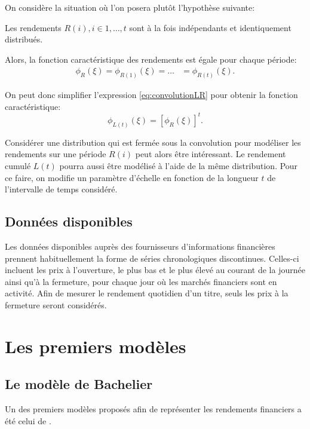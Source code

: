 On considère la situation où l'on posera plutôt l'hypothèse suivante:
\begin{hypothese}
  Les rendements $R(i), i \in 1, \ldots, t$ sont à la fois
  indépendants et identiquement distribués.
\end{hypothese}

Alors, la fonction caractéristique des rendements est égale pour
chaque période:
\begin{align}
  \label{eq:rendementsIID}
  \phi_{R}(\xi) = \phi_{R(1)}(\xi) = \ldots &= \phi_{R(t)}(\xi).
\end{align}

On peut donc simplifier l'expression \eqref{eq:convolutionLR} pour
obtenir la fonction caractéristique:
\begin{equation}
  \label{eq:convolution2}
  \phi_{L(t)}(\xi) = \left[\phi_{R}(\xi)\right]^t.
\end{equation}

Considérer une distribution qui est fermée sous la convolution pour
modéliser les rendements sur une période $R(i)$ peut alors être
intéressant. Le rendement cumulé $L(t)$ pourra aussi être
modélisé à l'aide de la même distribution. Pour ce faire, on modifie
un paramètre d’échelle en fonction de la longueur $t$ de l'intervalle
de temps considéré.

\subsection{Données disponibles}
\label{sec:donneesdisponibles}

Les données disponibles auprès des fournisseurs d'informations
financières prennent habituellement la forme de séries chronologiques
discontinues. Celles-ci incluent les prix à l'ouverture, le plus bas
et le plus élevé au courant de la journée ainsi qu'à la fermeture,
pour chaque jour où les marchés financiers sont en activité. Afin de
mesurer le rendement quotidien d'un titre, seuls les prix à la
fermeture seront considérés.

\section{Les premiers modèles}

\subsection{Le modèle de Bachelier}
\label{sec:bachelier}

Un des premiers modèles proposés afin de représenter les rendements
financiers a été celui de \cite{bachelier1900theorie} .

